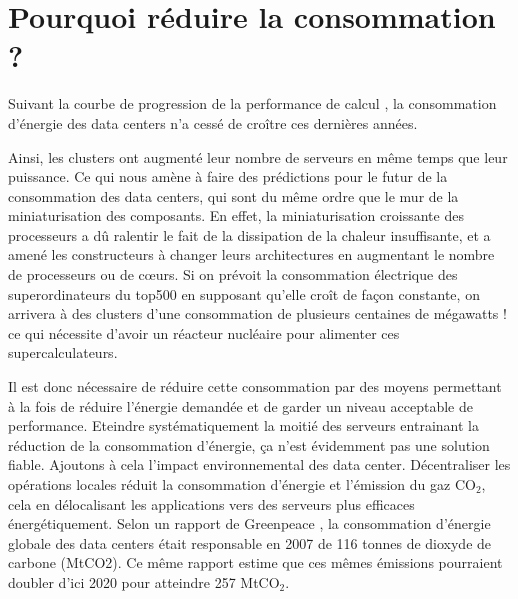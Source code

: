 \section{Pourquoi réduire la consommation ?}
\begin{onehalfspace}
Suivant la courbe de progression de la performance de calcul \cite{ref2}, la consommation d’énergie des data centers n’a cessé de croître ces dernières années. %

Ainsi, les clusters ont augmenté leur nombre de serveurs en même temps que leur puissance. Ce qui nous amène à faire des prédictions pour le futur de la consommation des data centers, qui sont du même ordre que le mur de la miniaturisation des composants. En effet, la miniaturisation croissante des processeurs a dû ralentir le fait de la dissipation de la chaleur insuffisante, et a amené les constructeurs à changer leurs architectures en augmentant le nombre de processeurs ou de cœurs. Si on prévoit la consommation électrique des superordinateurs du top500 \cite{WEB5} en supposant qu'elle croît de façon constante, on arrivera à des clusters d'une consommation de plusieurs centaines de mégawatts ! ce qui nécessite d'avoir un réacteur nucléaire pour alimenter ces supercalculateurs.\medskip 

Il est donc nécessaire de réduire cette consommation par des moyens permettant à la fois de réduire l’énergie demandée et de garder un niveau acceptable de performance. Eteindre systématiquement la moitié des serveurs entrainant  la  réduction de la consommation d’énergie, ça n’est évidemment pas une solution fiable. Ajoutons à cela l’impact environnemental des data center. Décentraliser les opérations locales réduit la consommation d’énergie et l’émission du gaz CO$_{2}$, cela en délocalisant les applications vers des serveurs plus efficaces énergétiquement. Selon un rapport de Greenpeace \cite{WEB4}, la  consommation d’énergie globale des data centers était responsable en 2007 de 116 tonnes de dioxyde de carbone (MtCO2). Ce même rapport estime que ces mêmes émissions pourraient doubler d’ici  2020 pour atteindre 257 MtCO$_{2}$.\medskip


\end{onehalfspace}
